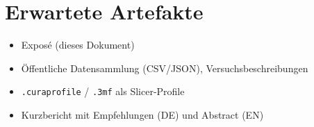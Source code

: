 \chapter{Erwartete Artefakte}
\label{cha:Erwartete Artefakte}

\begin{itemize}
\item Exposé (dieses Dokument)
\item Öffentliche Datensammlung (CSV/JSON), Versuchsbeschreibungen
\item \texttt{.curaprofile} / \texttt{.3mf} als Slicer-Profile
\item Kurzbericht mit Empfehlungen (DE) und Abstract (EN)
\end{itemize}